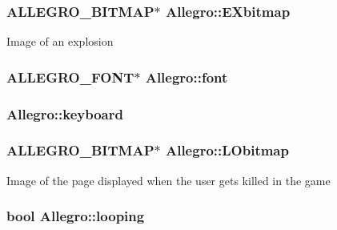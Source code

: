 \label{classAllegro_a4a2c1d6a0009b87fb04ac4726814623a}
\hypertarget{classAllegro_ad2c4aa4c19d5dbadb8c5c95b1e69dfa9}{
\subsubsection[{EXbitmap}]{\setlength{\rightskip}{0pt plus 5cm}ALLEGRO\_\-BITMAP$\ast$ {\bf Allegro::EXbitmap}}}
\label{classAllegro_ad2c4aa4c19d5dbadb8c5c95b1e69dfa9}
Image of an explosion \hypertarget{classAllegro_a2c2276e5a5822696792c9c11c00731f2}{
\subsubsection[{font}]{\setlength{\rightskip}{0pt plus 5cm}ALLEGRO\_\-FONT$\ast$ {\bf Allegro::font}}}
\label{classAllegro_a2c2276e5a5822696792c9c11c00731f2}
\hypertarget{classAllegro_a4bef38bf146ab5025f9a4f39bc7016f7}{
\subsubsection[{keyboard}]{ {\bf Allegro::keyboard}}}
\label{classAllegro_a4bef38bf146ab5025f9a4f39bc7016f7}
\hypertarget{classAllegro_aa9dd463e9143160fd90433e5eea920b0}{
\subsubsection[{LObitmap}]{\setlength{\rightskip}{0pt plus 5cm}ALLEGRO\_\-BITMAP$\ast$ {\bf Allegro::LObitmap}}}
\label{classAllegro_aa9dd463e9143160fd90433e5eea920b0}
Image of the page displayed when the user gets killed in the game \hypertarget{classAllegro_ae15c8aa4996c4a2063f5678630eb9e65}{
\subsubsection[{looping}]{\setlength{\rightskip}{0pt plus 5cm}bool {\bf Allegro::looping}}}
